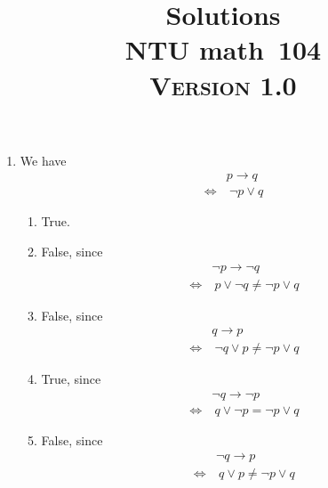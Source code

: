 \documentclass[a4paper,12pt]{article}
\newcommand{\school}{ntu}
\newcommand{\subject}{math}
\renewcommand{\year}{104}
\newcommand{\titlename}{\MakeUppercase{\school} \subject \ \year}
\newcommand{\ver}{\textsc{Version} 1.0} %
\begin{document}
\title{\LARGE{\textbf{Solutions}} \\
	\Huge{\textbf{\titlename}} \\
	\normalsize{\ver}
}
\author{}
\date{}

\maketitle


\begin{enumerate}
	\item We have \begin{equation}
		\begin{aligned}
			& p \rightarrow q \\
			\iff & \ \neg p \lor q
		\end{aligned}
	\end{equation}
	\begin{enumerate}[label=(\alph*)]
		\item True.
		\item False, since \begin{equation}
			\begin{aligned}
				& \neg p \rightarrow \neg q \\
				\iff & \ p \lor \neg q \neq \neg p \lor q
			\end{aligned}
		\end{equation}
		\item False, since \begin{equation}
			\begin{aligned}
				& q \rightarrow p \\
				\iff & \ \neg q \lor p \neq \neg p \lor q
			\end{aligned}
		\end{equation}
		\item True, since \begin{equation}
			\begin{aligned}
				& \neg q \rightarrow \neg p \\
				\iff & \ q \lor \neg p = \neg p \lor q
			\end{aligned}
		\end{equation}
		\item False, since \begin{equation}
			\begin{aligned}
				& \neg q \rightarrow p \\
				\iff & \ q \lor p \neq \neg p \lor q
			\end{aligned}

\end{equation}
\end{enumerate}
\end{enumerate}
\end{document}
